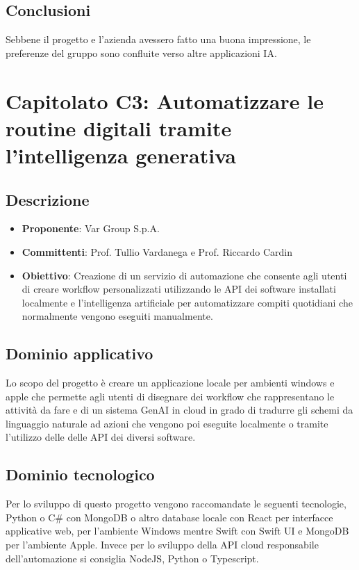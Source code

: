 \documentclass[italian, 12pt]{article}
\begin{document}
\subsection{Conclusioni}
Sebbene il progetto e l’azienda avessero fatto una buona impressione, le preferenze del gruppo sono confluite verso altre applicazioni IA.

\section{Capitolato C3: Automatizzare le routine digitali tramite l’intelligenza generativa}
\subsection{Descrizione}
\begin{itemize}
\item\textbf{Proponente}: Var Group S.p.A.
\item\textbf{Committenti}: Prof. Tullio Vardanega e Prof. Riccardo Cardin
\item\textbf{Obiettivo}: Creazione di un servizio di automazione che consente agli utenti di creare workflow personalizzati utilizzando le API dei software installati localmente e l'intelligenza artificiale per automatizzare compiti quotidiani che normalmente vengono eseguiti manualmente.
\end{itemize}

\subsection{Dominio applicativo}
Lo scopo del progetto è creare un applicazione locale per ambienti windows e apple che permette agli utenti di disegnare dei workflow che rappresentano le attività da fare e di un sistema GenAI in cloud in grado di tradurre gli schemi da linguaggio naturale ad azioni che vengono poi eseguite localmente o tramite l'utilizzo delle delle API dei diversi software.

\subsection{Dominio tecnologico}
Per lo sviluppo di questo progetto vengono raccomandate le seguenti tecnologie, Python o C\# con MongoDB o altro database locale con React per interfacce applicative web, per l'ambiente Windows mentre Swift con Swift UI e MongoDB per l'ambiente Apple. Invece per lo sviluppo della API cloud responsabile dell'automazione si consiglia NodeJS, Python o Typescript.
\end{document}
